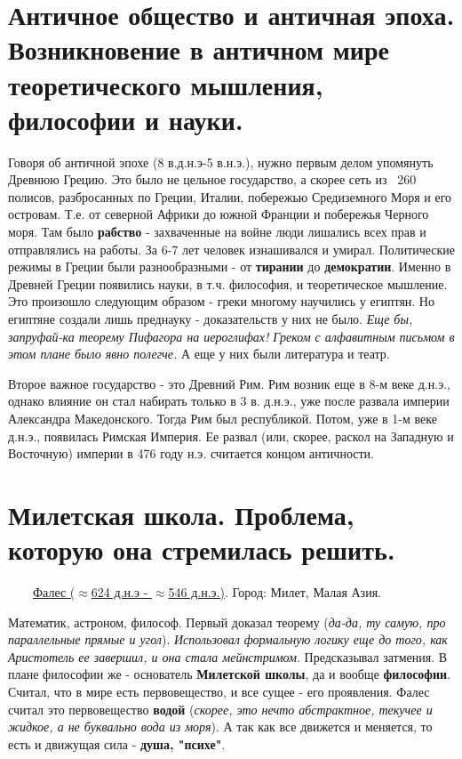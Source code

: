 \documentclass[12pt,a4paper]{article}
\begin{document}
\section{Античное общество и античная эпоха. Возникновение в античном мире теоретического мышления, философии и науки.}
Говоря об античной эпохе (8 в.д.н.э-5 в.н.э.), нужно первым делом упомянуть Древнюю Грецию. Это было не цельное государство, а скорее сеть из ~260 полисов, разбросанных по Греции, Италии, побережью Средиземного Моря и его островам. Т.е. от северной Африки до южной Франции и побережья Черного моря. Там было \textbf{рабство} - захваченные на войне люди лишались всех прав и отправлялись на работы. За 6-7 лет человек изнашивался и умирал.  Политические режимы в Греции были разнообразными - от \textbf{тирании} до \textbf{демократии}. Именно в Древней Греции появились науки, в т.ч. философия, и теоретическое мышление. Это произошло следующим образом - греки многому научились у египтян. Но египтяне создали лишь преднауку  - доказательств у них не было. \textit{Еще бы, запруфай-ка теорему Пифагора на иероглифах! Греком с алфавитным письмом  в этом плане было явно полегче.} А еще у них были литература и театр.

Второе важное государство - это Древний Рим. Рим возник еще в 8-м веке д.н.э., однако влияние он стал набирать только в 3 в. д.н.э., уже после развала империи Александра Македонского. Тогда Рим был республикой. Потом, уже в 1-м веке д.н.э., появилась Римская Империя. Ее развал (или, скорее, раскол на Западную и Восточную) империи в 476 году н.э. считается концом античности.

\section{Милетская школа. Проблема, которую она стремилась решить.}
\ \ \ \
\underline{Фалес ($\approx$624 д.н.э - $\approx$546 д.н.э.)}. Город: Милет, Малая Азия.

Математик, астроном, философ. Первый доказал теорему (\textit{да-да, ту самую, про параллельные прямые и угол}). \textit{Использовал формальную логику еще до того, как Аристотель ее завершил, и она стала мейнстримом}. Предсказывал затмения. В плане философии же - основатель \textbf{Милетской школы}, да и вообще \textbf{философии}. Считал, что в мире есть первовещество, и все сущее - его проявления. Фалес считал это первовещество \textbf{водой} (\textit{скорее, это нечто абстрактное, текучее и жидкое, а не буквально вода из моря}). А так как все движется и меняется, то есть и движущая сила - \textbf{душа, "психе"}.
\end{document}
